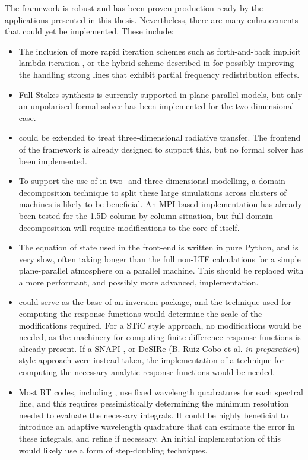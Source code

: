 The \Lw{} framework is robust and has been proven production-ready by the applications presented in this thesis.
Nevertheless, there are many enhancements that could yet be implemented.
These include:
\begin{itemize}
	\item The inclusion of more rapid iteration schemes such as forth-and-back implicit lambda iteration \citep{AtanackovicVukmanovic1997,Kuzmanovska2017}, or the hybrid scheme described in \citet{Avrett2008} for possibly improving the handling strong lines that exhibit partial frequency redistribution effects.
	\item Full Stokes synthesis is currently supported in plane-parallel models, but only an unpolarised formal solver has been implemented for the two-dimensional case.
	\item \Lw{} could be extended to treat three-dimensional radiative transfer. The frontend of the framework is already designed to support this, but no formal solver has been implemented.
	\item To support the use of \Lw{} in two- and three-dimensional modelling, a domain-decomposition technique to split these large simulations across clusters of machines is likely to be beneficial. An MPI-based implementation has already been tested for the 1.5D column-by-column situation, but full domain-decomposition will require modifications to the core of \Lw{} itself.
	\item The equation of state used in the front-end is written in pure Python, and is very slow, often taking longer than the full non-LTE calculations for a simple plane-parallel atmosphere on a parallel machine. This should be replaced with a more performant, and possibly more advanced, implementation.
	\item \Lw{} could serve as the base of an inversion package, and the technique used for computing the response functions would determine the scale of the modifications required. For a STiC \citep{2019dlcr} style approach, no modifications would be needed, as the machinery for computing finite-difference response functions is already present. If a SNAPI \citep{Milic2018}, or DeSIRe (B. Ruiz Cobo et al. \emph{in preparation}) style approach were instead taken, the implementation of a technique for computing the necessary analytic response functions would be needed.
	\item Most RT codes, including \Lw{}, use fixed wavelength quadratures for each spectral line, and this requires pessimistically determining the minimum resolution needed to evaluate the necessary integrals. It could be highly beneficial to introduce an adaptive wavelength quadrature that can estimate the error in these integrals, and refine if necessary. An initial implementation of this would likely use a form of step-doubling techniques.

\end{itemize}
